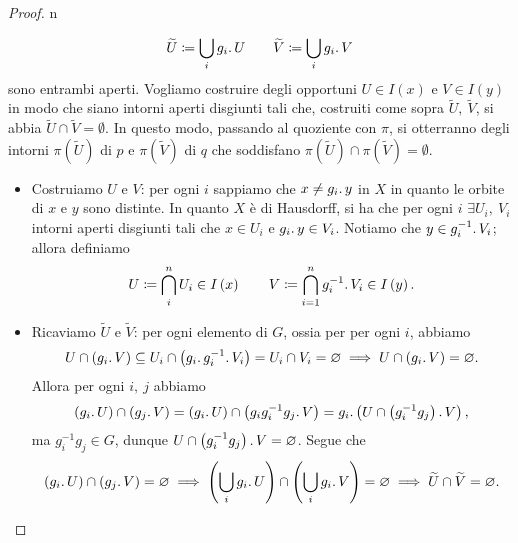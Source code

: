 \begin{proof}{n}
\begin{enumerate}[label=\Roman*]
\begin{equation*}
\widetilde{U}\coloneqq \bigcup_{i}g_i\ldotp U\qquad \widetilde{V}\coloneqq \bigcup_{i}g_i\ldotp V
\end{equation*}
sono entrambi aperti. Vogliamo costruire degli opportuni $U\in I\left(x\right)$ e $V\in I\left(y\right)$ in modo che siano intorni aperti disgiunti tali che, costruiti come sopra $\widetilde{U},\ \widetilde{V}$, si abbia $\widetilde{U}\cap \widetilde{V}=\emptyset$. In questo modo, passando al quoziente con $\pi$, si otterranno degli intorni $\pi\left(\widetilde{U}\right)$ di $p$ e $\pi\left(\widetilde{V}\right)$ di $q$ che soddisfano $\pi\left(\widetilde{U}\right)\cap \pi\left(\widetilde{V}\right)=\emptyset$.
\begin{itemize}
\item Costruiamo $U$ e $V$: per ogni $i$ sappiamo che $x\neq g_i\ldotp y$ in $X$ in quanto le orbite di $x$ e $y$ sono distinte. In quanto $X$ è di Hausdorff, si ha che per ogni $i$ $\exists U_i,\ V_i$ intorni aperti disgiunti tali che $x\in U_i$ e $g_i\ldotp y\in V_i$. Notiamo che $y\in g_i^{-1}\ldotp V_i$; allora definiamo
\begin{equation*}
U\coloneqq \bigcap_{i}^{n}U_i\in I\left(x\right)\qquad V\coloneqq \bigcap_{i=1}^{n}g_i^{-1}\ldotp V_i\in I\left(y\right).
\end{equation*}
\item Ricaviamo $\widetilde{U}$ e $\widetilde{V}$: per ogni elemento di $G$, ossia per per ogni $i$, abbiamo
\begin{equation*}
U\cap \left(g_i\ldotp V\right)\subseteq U_i \cap \left(g_i\ldotp g_i^{-1}\ldotp V_i\right)=U_i\cap V_i=\emptyset\implies U\cap \left(g_i\ldotp V\right)=\emptyset.
\end{equation*}
Allora per ogni $ i,\ j$ abbiamo
\begin{equation*}
	\left(g_i\ldotp U\right)\cap \left(g_j\ldotp V\right)=\left(g_i\ldotp U\right)\cap \left(g_ig_i^{-1}g_j\ldotp V\right)= g_i\ldotp \left(U\cap \left(g_i^{-1}g_j\right)\ldotp V\right),
\end{equation*}
ma $g_i^{-1}g_j \in G$, dunque $U\cap \left(g_i^{-1}g_j\right)\ldotp V=\emptyset$. Segue che
\begin{equation*}
	\left(g_i\ldotp U\right)\cap \left(g_j\ldotp V\right)=\emptyset\implies
	\left(\bigcup_{i}g_i\ldotp U\right)\cap \left(\bigcup_{i}g_i\ldotp V\right)=\emptyset\implies \widetilde{U}\cap \widetilde{V}=\emptyset.\qedhere
\end{equation*}	
\end{itemize}
\end{enumerate}
\end{proof}
